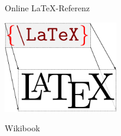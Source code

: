 \begin{frame}{Online \LaTeX-Referenz}
  \begin{center}
    \includegraphics[width=5cm]{buecher/wikibook}

    \xxx

    \Huge Wikibook
  \end{center}
\end{frame}

